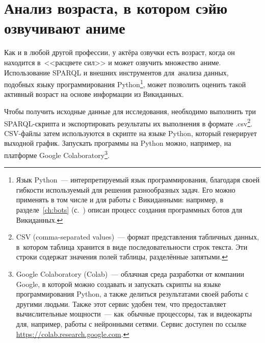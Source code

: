 \section{Анализ возраста, в котором сэйю озвучивают аниме}

Как и в любой другой профессии, у актёра озвучки есть возраст, 
когда он находится в~<<расцвете сил>> и может озвучить множество аниме. 
Использование SPARQL и внешних инструментов для~анализа данных, 
подобных языку программирования Python\footnote[][-1cm]{%
    Язык Python~--- интерпретируемый язык программирования, 
    благодаря своей гибкости используемый для решения разнообразных задач. 
    Его можно применять в том числе и для работы с Викиданными: 
    например, в разделе~\ref{ch:bots} (с.~\pageref{ch:bots}) 
    описан процесс создания программных ботов для Викиданных.%
%
}, может позволить оценить такой активный возраст на основе информации из Викиданных.


Чтобы получить исходные данные для исследования, необходимо выполнить три SPARQL-скрипта 
и экспортировать результаты их выполнения в формате .csv\footnote[][-0.3cm]{%
%
    CSV (comma-separated values)~--- формат представления табличных данных, 
    в~котором таблица хранится в виде последовательности строк текста. 
    Эти строки содержат значения полей таблицы, разделённые запятыми.%
%
}. CSV-файлы затем используются в скрипте на языке Python, 
который генерирует выходной график. 
Запускать программы на Python можно, например, 
на платформе Google Colaboratory\footnote[][0.2cm]{%
%
    Google Colaboratory (Colab)~--- облачная среда разработки от компании Google, 
    в которой можно создавать и запускать скрипты на языке программирования Python, 
    а также делиться результатами своей работы с другими людьми. 
    \mbox{Также} этот сервис удобен тем, что предоставляет вычислительные мощности~--- 
    как~обычные процессоры, так и видеокарты для, например, работы с нейронными сетями. 
    Сервис доступен по ссылке \href{https://colab.research.google.com}{https://colab.research.google.com}.%
}.



